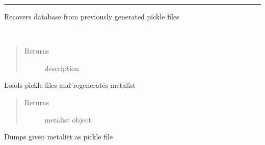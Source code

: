 \documentclass[letterpaper,10pt,english]{sphinxmanual}
\begin{document}
\bigskip\hrule{}\bigskip


\begin{fulllineitems}
\label{recover:dbrecover.pickle_recover.PickleDBRecover}
Recovers database from previously generated pickle files

\begin{fulllineitems}
\label{recover:dbrecover.pickle_recover.PickleDBRecover.description}~\begin{quote}\begin{description}
\item[{Returns}] \leavevmode
description

\end{description}\end{quote}

\end{fulllineitems}


\begin{fulllineitems}
\label{recover:dbrecover.pickle_recover.PickleDBRecover.load}
Loads pickle files and regenerates metalist
\begin{quote}\begin{description}
\item[{Returns}] \leavevmode
metalist object

\end{description}\end{quote}

\end{fulllineitems}


\begin{fulllineitems}
\label{recover:dbrecover.pickle_recover.PickleDBRecover.save}
Dumps given metalist as pickle file

\end{fulllineitems}


\end{fulllineitems}
\end{document}
